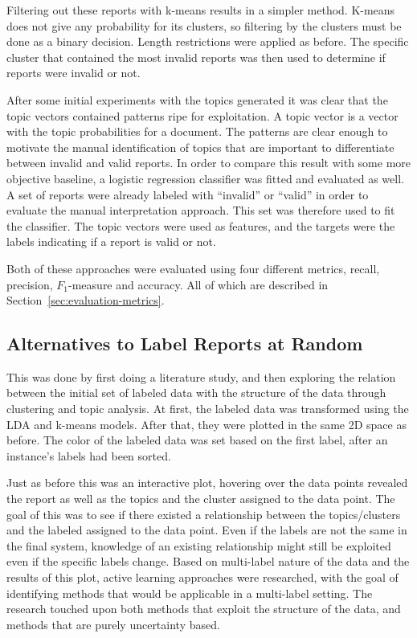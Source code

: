 Filtering out these reports with k-means results in a simpler method.
K-means does not give any probability for its clusters, so filtering by the clusters must be done as a binary decision.
Length restrictions were applied as before.
The specific cluster that contained the most invalid reports was then used to determine if reports were invalid or not.

After some initial experiments with the topics generated it was clear that the topic vectors contained patterns ripe for exploitation.
A topic vector is a vector with the topic probabilities for a document.
The patterns are clear enough to motivate the manual identification of topics that are important to differentiate between invalid and valid reports.
In order to compare this result with some more objective baseline, a logistic regression classifier was fitted and evaluated as well.
A set of reports were already labeled with ``invalid'' or ``valid'' in order to evaluate the manual interpretation approach.
This set was therefore used to fit the classifier.
The topic vectors were used as features, and the targets were the labels indicating if a report is valid or not.

Both of these approaches were evaluated using four different metrics, recall, precision, $F_1$-measure and accuracy.
All of which are described in Section~\ref{sec:evaluation-metrics}.

\subsection{Alternatives to Label Reports at Random}\label{sec:exp2-method}

This was done by first doing a literature study, and then exploring the relation between the initial set of labeled data with the structure of the data through clustering and topic analysis.
At first, the labeled data was transformed using the LDA and k-means models.
After that, they were plotted in the same 2D space as before.
The color of the labeled data was set based on the first label, after an instance's labels had been sorted.

Just as before this was an interactive plot, hovering over the data points revealed the report as well as the topics and the cluster assigned to the data point.
The goal of this was to see if there existed a relationship between the topics/clusters and the labeled assigned to the data point.
Even if the labels are not the same in the final system, knowledge of an existing relationship might still be exploited even if the specific labels change.
Based on multi-label nature of the data and the results of this plot, active learning approaches were researched, with the goal of identifying methods that would be applicable in a multi-label setting.
The research touched upon both methods that exploit the structure of the data, and methods that are purely uncertainty based.


